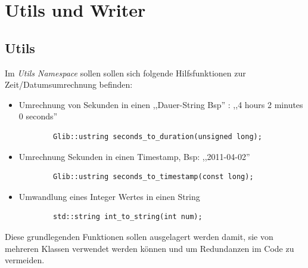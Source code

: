 \section{Utils und Writer} 

\subsection{Utils}
Im \emph{Utils Namespace} sollen sollen sich folgende Hilfsfunktionen zur Zeit/Datumsumrechnung befinden:

\begin{itemize}
    \item Umrechnung von Sekunden in einen ,,Dauer-String Bsp'' : ,,4 hours 2 minutes 0 seconds''

        \begin{verbatim}
        Glib::ustring seconds_to_duration(unsigned long);
        \end{verbatim}

    \item Umrechnung Sekunden in einen Timestamp, Bsp: ,,2011-04-02''
        \begin{verbatim}
        Glib::ustring seconds_to_timestamp(const long);
        \end{verbatim}

    \item Umwandlung eines Integer Wertes in einen String
        \begin{verbatim}
        std::string int_to_string(int num);
        \end{verbatim}
\end{itemize}


Diese grundlegenden Funktionen sollen ausgelagert werden damit, sie von mehreren Klassen verwendet werden können und um Redundanzen im 
Code zu vermeiden.

